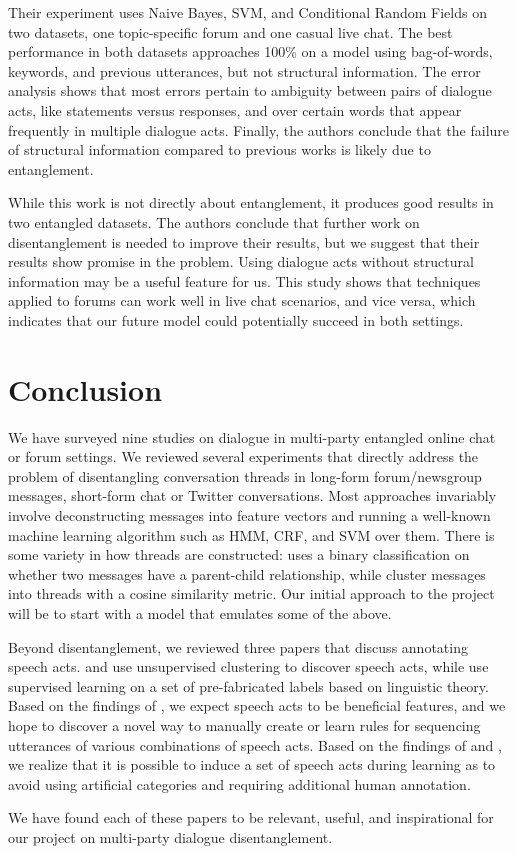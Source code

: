 \documentclass[11pt]{article}
\begin{document}
Their experiment uses Naive Bayes, SVM, and Conditional Random Fields on two
datasets, one topic-specific forum and one casual live chat. The best
performance in both datasets approaches 100\% on a model using bag-of-words,
keywords, and previous utterances, but not structural information. The error
analysis shows that most errors pertain to ambiguity between pairs of dialogue
acts, like statements versus responses, and over certain words that appear
frequently in multiple dialogue acts. Finally, the authors conclude that the
failure of structural information compared to previous works is likely due to
entanglement.

While this work is not directly about entanglement, it produces good results in
two entangled datasets. The authors conclude that further work on
disentanglement is needed to improve their results, but we suggest that their
results show promise in the problem. Using
dialogue acts without structural information may be a useful feature
for us. This study shows that techniques applied to forums can work well
in live chat scenarios, and vice versa, which indicates that our future model
could potentially succeed in both settings.

\section{Conclusion}

We have surveyed nine studies on dialogue in multi-party entangled online 
chat or forum settings. We reviewed several experiments that directly address
the problem of disentangling conversation threads in long-form forum/newsgroup messages,
short-form chat or Twitter conversations. Most approaches
invariably involve deconstructing messages into feature vectors and running a 
well-known machine learning algorithm such as HMM, CRF, and SVM over them.
There is some variety in how threads are constructed: \cite{Aumayr2011a} uses
a binary classification on whether two messages have a parent-child
relationship, while \cite{Mayfield2012a} cluster messages into threads with 
a cosine similarity metric. Our initial approach to the project will be to 
start with a model that emulates some of the above.

Beyond disentanglement, we reviewed three papers that discuss annotating 
speech acts. \cite{Ritter2010a} and \cite{Paula} use unsupervised clustering 
to discover speech acts, while \cite{Kim2012} use supervised learning on a set 
of pre-fabricated labels based on linguistic theory. Based on the findings of 
\cite{Kim2012}, we expect speech acts to be beneficial features, and we hope 
to discover a novel way to manually create or learn rules for sequencing 
utterances of various combinations of speech acts. Based on the findings of
\cite{Ritter2010a} and \cite{Paula}, we realize that it is possible to induce 
a set of speech acts during learning as to avoid using artificial categories 
and requiring additional human annotation.

We have found each of these papers to be relevant, useful, and inspirational
for our project on multi-party dialogue disentanglement.

{} 
\end{document}
